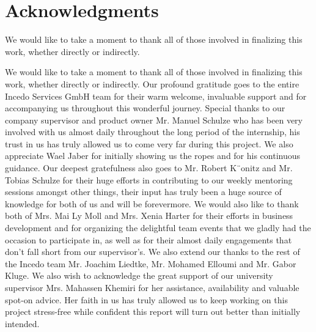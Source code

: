 \section*{Acknowledgments}
We would like to take a moment to thank all of those involved in finalizing this work, whether directly or indirectly.

We would like to take a moment to thank all of those involved in finalizing
this work, whether directly or indirectly.
Our profound gratitude goes to the entire Incedo Services GmbH team
for their warm welcome, invaluable support and for accompanying us throughout this wonderful journey. Special thanks to our company supervisor and
product owner Mr. Manuel Schulze who has been very involved with us
almost daily throughout the long period of the internship, his trust in us
has truly allowed us to come very far during this project. We also appreciate Wael Jaber for initially showing us the ropes and for his continuous
guidance. Our deepest gratefulness also goes to Mr. Robert K¨onitz and
Mr. Tobias Schulze for their huge efforts in contributing to our weekly
mentoring sessions amongst other things, their input has truly been a huge
source of knowledge for both of us and will be forevermore. We would also
like to thank both of Mrs. Mai Ly Moll and Mrs. Xenia Harter for
their efforts in business development and for organizing the delightful team
events that we gladly had the occasion to participate in, as well as for their
almost daily engagements that don’t fall short from our supervisor’s. We also
extend our thanks to the rest of the Incedo team Mr. Joachim Liedtke,
Mr. Mohamed Elloumi and Mr. Gabor Kluge.
We also wish to acknowledge the great support of our university supervisor
Mrs. Mahassen Khemiri for her assistance, availability and valuable
spot-on advice. Her faith in us has truly allowed us to keep working on
this project stress-free while confident this report will turn out better than
initially intended.
\newpage
